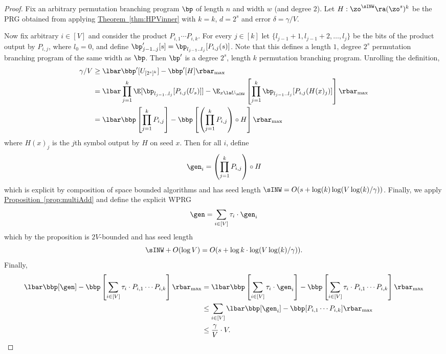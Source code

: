 \documentclass[11pt]{article}
\newcommand{\expref}[2]{\texorpdfstring{\hyperref[#2]{#1~\ref{#2}}}{#1~\ref{#2}}}
\begin{document}
\begin{proof}
Fix an arbitrary permutation branching program $\bp$ of length $n$ and width $w$ (and degree $2$). Let $H:\zo^{\sINW}\ra (\zo^s)^k$ be the PRG obtained from applying \expref{Theorem}{thm:HPVinner} with $k=k$, $d=2^s$ and error $\delta=\gamma/V$.

Now fix arbitrary $i \in [V]$ and consider the product $P_{i,1}\cdots P_{i,k}$. For every $j\in[k]$ let $\{l_{j-1}+1,l_{j-1}+2,\ldots,l_j\}$ be the bits of the product output by $P_{i,j}$, where $l_{0}=0$, and define $\bp'_{j-1..j}[s]=\bp_{l_{j-1}..l_j}[P_{i,j}(s)]$. Note that this defines a length $1$, degree $2^s$ permutation branching program of the same width as $\bp$.
Then $\bp'$ is a degree $2^s$, length $k$ permutation branching program. Unrolling the definition,
\begin{align*}
    \gamma/V &\geq \lbar\bbp'[U_{[2^s]^k}]-\bbp'[H]\rbar_{\max}\\
    &= \lbar \prod_{j=1}^k\E[\bp_{l_{j-1}..l_j}[P_{i,j}(U_s)]] - \E_{x\la U_{\sINW}}\left[ \prod_{j=1}^k\bp_{l_{j-1}..l_j}[P_{i,j}(H(x)_j)]\right]\rbar_{\max}\\
    &= \lbar\bbp\left[\prod_{j=1}^k P_{i,j}\right] - \bbp\left[\left(\prod_{j=1}^k P_{i,j}\right)\circ H\right]\rbar_{\max}
\end{align*}
where $H(x)_j$ is the $j$th symbol output by $H$ on seed $x$. Then for all $i$, define 
\[\gen_i=\left(\prod_{j=1}^k P_{i,j}\right)\circ H\]
which is explicit by composition of space bounded algorithms and has seed length $\sINW=O(s+\log(k)\log(V\log(k)/\gamma))$.
Finally, we apply \expref{Proposition}{prop:multiAdd} and define the explicit WPRG
$$\gen=\sum_{i\in [V]} \tau_i \cdot \gen_i$$
which by the proposition is $2V$-bounded and has seed length \[\sINW+O(\log V)=O(s+\log k\cdot\log(V\log(k)/\gamma)).\]
Finally, 
\begin{align*}
    \lbar \bbp[\gen]-\bbp\left[\sum_{i\in[V]}\tau_i\cdot P_{i,1}\cdots P_{i,k}\right]\rbar_{\max} &=
    \lbar \bbp\left[\sum_{i\in[V]}\tau_i \cdot\gen_i\right]-\bbp\left[\sum_{i\in[V]}\tau_i\cdot P_{i,1}\cdots P_{i,k}\right]\rbar_{\max}\\ 
    &\leq \sum_{i\in [V]}\lbar \bbp[\gen_i] - \bbp[P_{i,1}\cdots P_{i,k}]\rbar_{\max}\\
    &\leq \frac{\gamma}{V}\cdot V. \qedhere 
\end{align*}
\end{proof}
\end{document}
